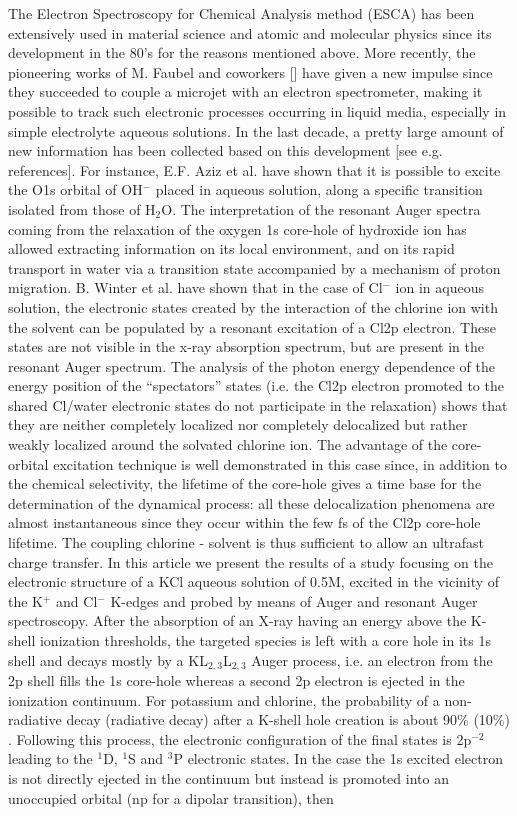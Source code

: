 The Electron Spectroscopy for Chemical Analysis method (ESCA) has been extensively used in material science and atomic and molecular physics since its development in the 80’s for the reasons mentioned above. More recently, the pioneering works of M. Faubel and coworkers [] have given a new impulse since they succeeded to couple a microjet with an electron spectrometer, making it possible to track such electronic processes occurring in liquid media, especially in simple electrolyte aqueous solutions. In the last decade, a pretty large amount of new information has been collected based on this development [see e.g. references]. For instance, E.F. Aziz et al. \citep{aziz08:89} have shown that it is possible to excite the O1s orbital of OH$^-$ placed in aqueous solution, along a specific transition isolated from those of H$_2$O. The interpretation of the resonant Auger spectra coming from the relaxation of the oxygen 1s core-hole of hydroxide ion has allowed extracting information on its local environment, and on its rapid transport in water via a transition state accompanied by a mechanism of proton migration. B. Winter et al. \citep{Winter08:7130} have shown that in the case of Cl$^{-}$ ion in aqueous solution, the electronic states created by the interaction of the chlorine ion with the solvent can be populated by a resonant excitation of a Cl2p electron. These states are not visible in the  x-ray absorption spectrum, but are present in the resonant Auger spectrum. The analysis of the photon energy dependence of the energy position of the ``spectators'' states (i.e. the Cl2p electron promoted to the shared Cl/water electronic states do not participate in the relaxation) shows that they are neither completely localized nor completely delocalized but rather weakly localized around the solvated chlorine ion. The advantage of the core-orbital excitation technique is well demonstrated in this case since, in addition to the chemical selectivity, the lifetime of the core-hole gives a time base for the determination of the dynamical process: all these delocalization phenomena are almost instantaneous since they occur within the few fs of the Cl2p core-hole lifetime. The coupling chlorine - solvent is thus sufficient to allow an ultrafast charge transfer. In this article we present the results of a study focusing on the electronic structure of a KCl aqueous solution of 0.5M, excited in the vicinity of the K$^{+}$ and Cl$^{-}$ K-edges and probed by means of Auger and resonant Auger spectroscopy. After the absorption of an X-ray having an energy above the K-shell ionization thresholds, the targeted species is left with a core hole in its 1s shell and decays mostly by a KL$_{2,3}$L$_{2,3}$ Auger process, i.e. an electron from the 2p shell fills the 1s core-hole whereas a second 2p electron is ejected in the ionization continuum. For potassium and chlorine, the probability of a non-radiative decay (radiative decay) after a K-shell hole creation is about 90\% (10\%) \citep{Krause79:307}. Following this process, the electronic configuration of the final states is 2p$^{-2}$ leading to the $^1$D, $^1$S and $^3$P electronic states. In the case the 1s excited electron is not directly  ejected in the continuum but instead is promoted into an unoccupied orbital (np for a dipolar transition), then 